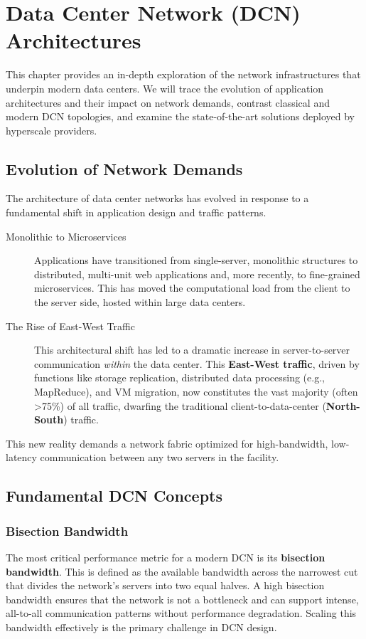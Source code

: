 \chapter{Data Center Network (DCN) Architectures}
\author{Guido Maier}

This chapter provides an in-depth exploration of the network infrastructures that underpin modern data centers. We will trace the evolution of application architectures and their impact on network demands, contrast classical and modern DCN topologies, and examine the state-of-the-art solutions deployed by hyperscale providers.

\section{Evolution of Network Demands}
The architecture of data center networks has evolved in response to a fundamental shift in application design and traffic patterns.
\begin{description}
    \item[Monolithic to Microservices] Applications have transitioned from single-server, monolithic structures to distributed, multi-unit web applications and, more recently, to fine-grained microservices. This has moved the computational load from the client to the server side, hosted within large data centers.
    \item[The Rise of East-West Traffic] This architectural shift has led to a dramatic increase in server-to-server communication \textit{within} the data center. This \textbf{East-West traffic}, driven by functions like storage replication, distributed data processing (e.g., MapReduce), and VM migration, now constitutes the vast majority (often >75\%) of all traffic, dwarfing the traditional client-to-data-center (\textbf{North-South}) traffic.
\end{description}
This new reality demands a network fabric optimized for high-bandwidth, low-latency communication between any two servers in the facility.

\section{Fundamental DCN Concepts}
\subsection{Bisection Bandwidth}
The most critical performance metric for a modern DCN is its \textbf{bisection bandwidth}. This is defined as the available bandwidth across the narrowest cut that divides the network's servers into two equal halves. A high bisection bandwidth ensures that the network is not a bottleneck and can support intense, all-to-all communication patterns without performance degradation. Scaling this bandwidth effectively is the primary challenge in DCN design.

